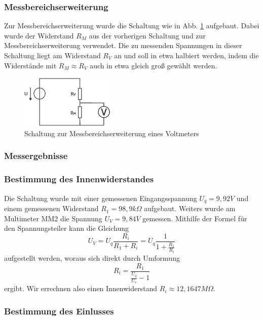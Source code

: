 \documentclass[a4paper]{article}
\begin{document}
\subsubsection*{Messbereichserweiterung}
Zur Messbereichserweiterung wurde die Schaltung wie in Abb. \ref{fig:1c_MB-ErweiterungVM}
aufgebaut. Dabei wurde der Widerstand $R_{M}$ aus der vorherigen Schaltung
und zur Messbereichserweiterung verwendet. Die zu messenden Spannungen in dieser
Schaltung liegt am Widerstand $R_{V}$ an und soll in etwa halbiert werden, indem
die Widerstände mit $R_{M}\approx R_{V}$ auch in etwa gleich groß gewählt werden.

\begin{figure}[h]
    \centering
    \includegraphics[width=0.4\textwidth]{schematics/1c_MessbereichserweiterungVM.png}
    \caption{Schaltung zur Messbereichserweiterung eines Voltmeters}
    \label{fig:1c_MB-ErweiterungVM}
\end{figure}


\subsubsection{Messergebnisse}
\subsubsection*{\textbf{Bestimmung des Innenwiderstandes}}
Die Schaltung wurde mit einer gemessenen Eingangsspannung $U_{q}=9,92\unit{V}$ und einem
gemessenen Widerstand $R_{1}=98,9 \unit{k\Omega}$ aufgebaut. Weiters wurde am
Multimeter MM2 die Spannung $U_{V}=9,84\unit{V}$ gemessen. Mithilfe der Formel
für den Spannungsteiler kann die Gleichung
\[ U_{V}=U_{q} \frac{R_{i}}{R_{1}+R_{i}} = U_{q} \frac{1}{1 + \frac{R_{1}}{R_{i}}}\]
aufgestellt werden, woraus sich direkt durch Umformung
    \[ R_{i}=\frac{R_{1}}{\frac{U_{q}}{U_{v}}-1} \]
ergibt.
Wir errechnen also einen Innenwiderstand $R_{i}\approx 12,1647 \unit{M\Omega}$.

\subsubsection*{\textbf{Bestimmung des Einlusses}}
\end{document}
